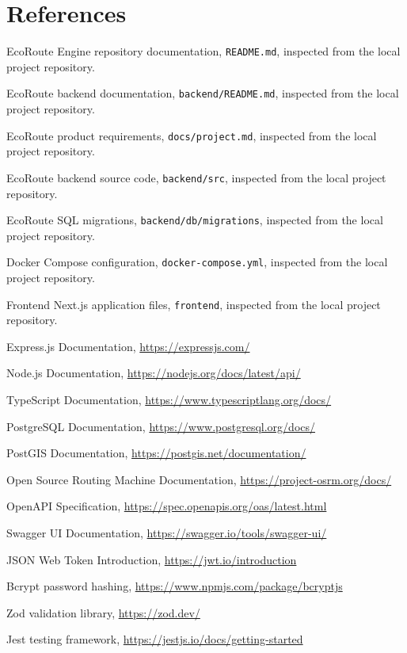 \documentclass[12pt,a4paper]{report}
\begin{document}
\chapter*{References}
\begin{enumerate}[label={[\arabic*]},leftmargin=0.3in,itemsep=2pt]
\item EcoRoute Engine repository documentation, \texttt{README.md}, inspected from the local project repository.
\item EcoRoute backend documentation, \texttt{backend/README.md}, inspected from the local project repository.
\item EcoRoute product requirements, \texttt{docs/project.md}, inspected from the local project repository.
\item EcoRoute backend source code, \texttt{backend/src}, inspected from the local project repository.
\item EcoRoute SQL migrations, \texttt{backend/db/migrations}, inspected from the local project repository.
\item Docker Compose configuration, \texttt{docker-compose.yml}, inspected from the local project repository.
\item Frontend Next.js application files, \texttt{frontend}, inspected from the local project repository.
\item Express.js Documentation, \url{https://expressjs.com/}
\item Node.js Documentation, \url{https://nodejs.org/docs/latest/api/}
\item TypeScript Documentation, \url{https://www.typescriptlang.org/docs/}
\item PostgreSQL Documentation, \url{https://www.postgresql.org/docs/}
\item PostGIS Documentation, \url{https://postgis.net/documentation/}
\item Open Source Routing Machine Documentation, \url{https://project-osrm.org/docs/}
\item OpenAPI Specification, \url{https://spec.openapis.org/oas/latest.html}
\item Swagger UI Documentation, \url{https://swagger.io/tools/swagger-ui/}
\item JSON Web Token Introduction, \url{https://jwt.io/introduction}
\item Bcrypt password hashing, \url{https://www.npmjs.com/package/bcryptjs}
\item Zod validation library, \url{https://zod.dev/}
\item Jest testing framework, \url{https://jestjs.io/docs/getting-started}

\end{enumerate}
\end{document}
